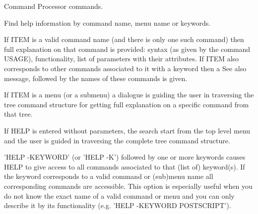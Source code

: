 \ifMENUtext
   \par
Command Processor commands.  


\fi


\BEGARG
{}
\ENDARG
{}
\ENDOPT

   \par
Find help information by command name, menu name or keywords.  

   \par
If ITEM is a valid command name (and there is only one such command) then 
   full explanation on that command is provided: syntax (as given by the 
   command USAGE), functionality, list of parameters with their attributes.  
   If ITEM also corresponds to other commands associated to it with a 
   \DQUOTE{}keyword\DQUOTE{} then a \DQUOTE{}See also\DQUOTE{} message, 
   followed by the names of these commands is given.  

   \par
If ITEM is a menu (or a submenu) a dialogue is guiding the user in 
   traversing the tree command structure for getting full explanation on a 
   specific command from that tree.  

   \par
If HELP is entered without parameters, the search start from the top level 
   menu and the user is guided in traversing the complete tree command 
   structure.  

   \par
'HELP -KEYWORD' (or 'HELP -K') followed by one or more keywords causes HELP 
   to give access to all commands associated to that (list of) keyword(s).  If 
   the keyword corresponds to a valid command or (sub)menu name all 
   corresponding commands are accessible. This option is especially useful 
   when you do not know the exact name of a valid command or menu and you can 
   only describe it by its functionality (e.g. 'HELP -KEYWORD POSTSCRIPT').  


